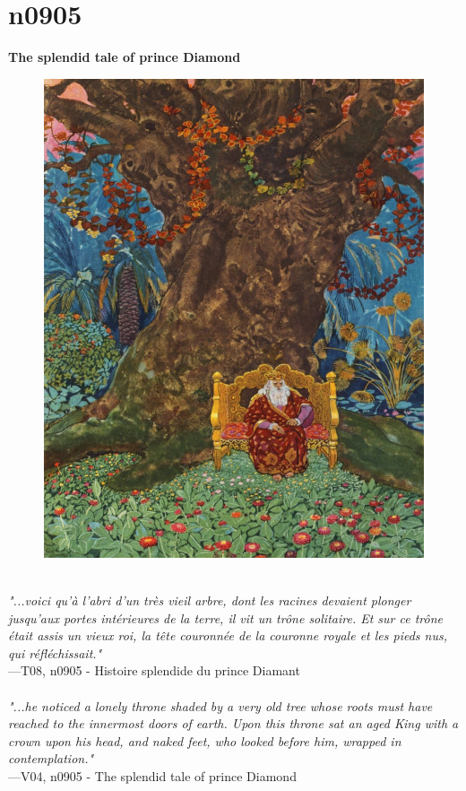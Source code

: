 \documentclass[../Carre_nights.tex]{subfiles}
\begin{document}
\section{n0905}
\textbf{\Large{The splendid tale of prince Diamond}} \\

\begin{figure}[ht]
\centering
\includegraphics[height=\figsize]{illustrations/volume_8/T08, n0905 - Histoire splendide du prince Diamant.jpg}
\end{figure}

\textit{\\
"...voici qu’à l’abri d’un très vieil arbre, dont les racines devaient plonger jusqu’aux portes intérieures de la terre, il vit un trône solitaire. Et sur ce trône était assis un vieux roi, la tête couronnée de la couronne royale et les pieds nus, qui réfléchissait."} \\
—T08, n0905 - Histoire splendide du prince Diamant \\~\\
\textit{"...he noticed a lonely throne shaded by a very old tree whose roots must have reached to the innermost doors of earth. Upon this throne sat an aged King with a crown upon his head, and naked feet, who looked before him, wrapped in contemplation."} \\
—V04, n0905 - The splendid tale of prince Diamond
\end{document}
